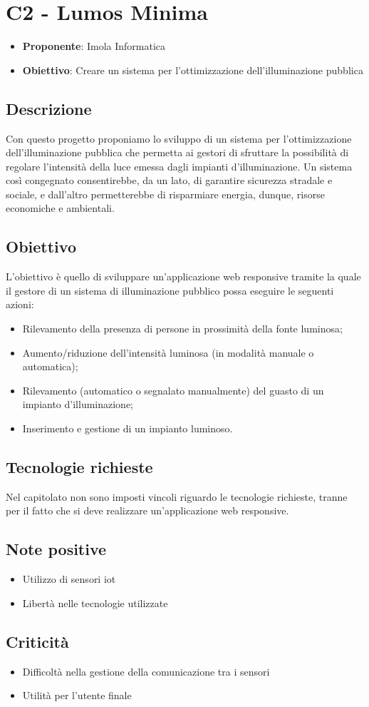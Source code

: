 \section*{C2 - Lumos Minima}
\begin{itemize}
    \item \textbf{Proponente}: Imola Informatica
    \item \textbf{Obiettivo}: Creare un sistema per l’ottimizzazione dell’illuminazione pubblica
\end{itemize}

\subsection*{Descrizione}
Con questo progetto proponiamo lo sviluppo di un sistema per l’ottimizzazione dell’illuminazione pubblica che permetta ai gestori di sfruttare la possibilità di regolare l’intensità
della luce emessa dagli impianti d’illuminazione. Un sistema così congegnato consentirebbe, da un lato, di garantire sicurezza stradale e sociale, e dall’altro permetterebbe di
risparmiare energia, dunque, risorse economiche e ambientali.

\subsection*{Obiettivo}
L’obiettivo è quello di sviluppare un’applicazione web responsive tramite la quale il gestore
di un sistema di illuminazione pubblico possa eseguire le seguenti azioni:
\begin{itemize}
    \item Rilevamento della presenza di persone in prossimità della fonte luminosa;
    \item Aumento/riduzione dell’intensità luminosa (in modalità manuale o automatica);
    \item Rilevamento (automatico o segnalato manualmente) del guasto di un impianto d'illuminazione;
    \item  Inserimento e gestione di un impianto luminoso.
\end{itemize}

\subsection*{Tecnologie richieste}
Nel capitolato non sono imposti vincoli riguardo le tecnologie richieste, tranne per il fatto
che si deve realizzare un’applicazione web responsive.

\subsection*{Note positive}
\begin{itemize}
    \item Utilizzo di sensori iot
    \item Libertà nelle tecnologie utilizzate
\end{itemize}
\subsection*{Criticità}
\begin{itemize}
    \item Difficoltà nella gestione della comunicazione tra i sensori
    \item Utilità per l’utente finale
\end{itemize}